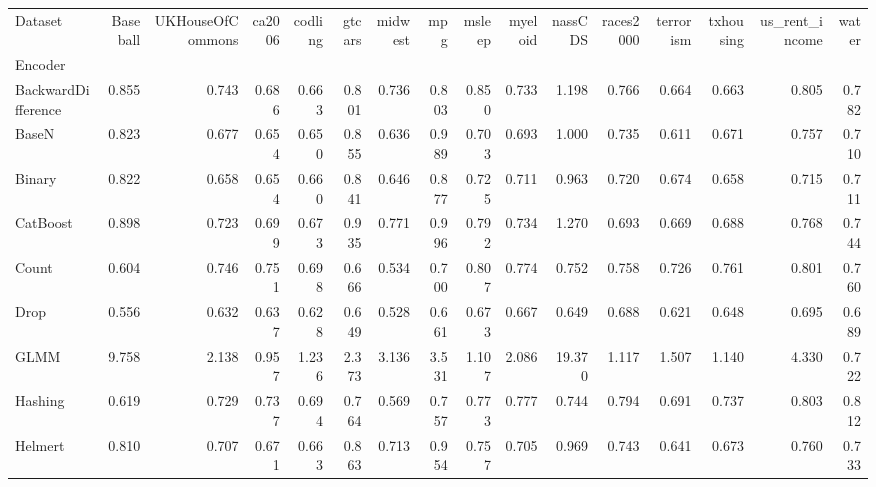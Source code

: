 \begin{tabular}{lrrrrrrrrrrrrrrr}
\toprule
Dataset &  Baseball &  UKHouseOfCommons &  ca2006 &  codling &  gtcars &  midwest &    mpg &  msleep &  myeloid &  nassCDS &  races2000 &  terrorism &  txhousing &  us\_rent\_income &  water \\
Encoder            &           &                   &         &          &         &          &        &         &          &          &            &            &            &                 &        \\
\midrule
BackwardDifference &     0.855 &             0.743 &   0.686 &    0.663 &   0.801 &    0.736 &  0.803 &   0.850 &    0.733 &    1.198 &      0.766 &      0.664 &      0.663 &           0.805 &  0.782 \\
BaseN              &     0.823 &             0.677 &   0.654 &    0.650 &   0.855 &    0.636 &  0.989 &   0.703 &    0.693 &    1.000 &      0.735 &      0.611 &      0.671 &           0.757 &  0.710 \\
Binary             &     0.822 &             0.658 &   0.654 &    0.660 &   0.841 &    0.646 &  0.877 &   0.725 &    0.711 &    0.963 &      0.720 &      0.674 &      0.658 &           0.715 &  0.711 \\
CatBoost           &     0.898 &             0.723 &   0.699 &    0.673 &   0.935 &    0.771 &  0.996 &   0.792 &    0.734 &    1.270 &      0.693 &      0.669 &      0.688 &           0.768 &  0.744 \\
Count              &     0.604 &             0.746 &   0.751 &    0.698 &   0.666 &    0.534 &  0.700 &   0.807 &    0.774 &    0.752 &      0.758 &      0.726 &      0.761 &           0.801 &  0.760 \\
Drop               &     0.556 &             0.632 &   0.637 &    0.628 &   0.649 &    0.528 &  0.661 &   0.673 &    0.667 &    0.649 &      0.688 &      0.621 &      0.648 &           0.695 &  0.689 \\
GLMM               &     9.758 &             2.138 &   0.957 &    1.236 &   2.373 &    3.136 &  3.531 &   1.107 &    2.086 &   19.370 &      1.117 &      1.507 &      1.140 &           4.330 &  0.722 \\
Hashing            &     0.619 &             0.729 &   0.737 &    0.694 &   0.764 &    0.569 &  0.757 &   0.773 &    0.777 &    0.744 &      0.794 &      0.691 &      0.737 &           0.803 &  0.812 \\
Helmert            &     0.810 &             0.707 &   0.671 &    0.663 &   0.863 &    0.713 &  0.954 &   0.757 &    0.705 &    0.969 &      0.743 &      0.641 &      0.673 &           0.760 &  0.733 \\

\end{tabular}
